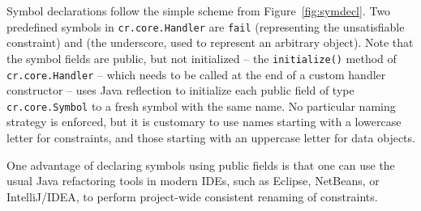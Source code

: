 \documentclass[runningheads,a4paper,11pt,dvipsname]{llncs}
\begin{document}
Symbol declarations follow the simple scheme from
Figure~\ref{fig:symdecl}.  Two predefined symbols in
\texttt{cr.core.Handler} are \texttt{fail} (representing the
unsatisfiable constraint) and \texttt{} (the underscore, used
to represent an arbitrary object).  Note that the symbol fields are
public, but not initialized -- the \texttt{initialize()} method of
\texttt{cr.core.Handler} -- which needs to be called at the end of a
custom handler constructor -- uses Java reflection to initialize each
public field of type \texttt{cr.core.Symbol} to a fresh symbol with
the same name.  No particular naming strategy is enforced, but it is
customary to use names starting with a lowercase letter for
constraints, and those starting with an uppercase letter for data
objects.

One advantage of declaring symbols using public fields is that one can
use the usual Java refactoring tools in modern IDEs, such as Eclipse,
NetBeans, or IntelliJ/IDEA, to perform project-wide consistent
renaming of constraints.
\end{document}
